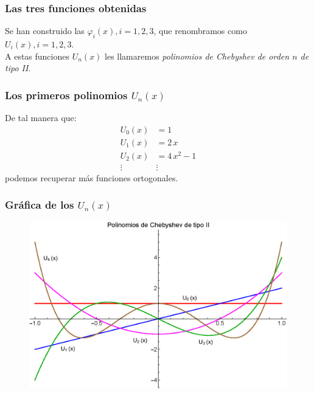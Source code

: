 \documentclass[12pt]{beamer}
\begin{document}
\begin{frame}
\frametitle{Las tres funciones obtenidas}
Se han construido las $\varphi_{i}(x), i = 1, 2, 3$, que renombramos como $U_{i}(x), i = 1, 2, 3$.
\\
\bigskip
\pause
A estas funciones $U_{n}(x)$ les llamaremos \emph{polinomios de Chebyshev de orden $n$ de tipo II}.
\end{frame}
\begin{frame}
\frametitle{Los primeros polinomios $U_{n}(x)$}
De tal manera que:
\pause
\begin{align*}
U_{0} (x) &= 1 \\[0.5em]
U_{1} (x) &= 2 \, x \\[0.5em]
U_{2} (x) &= 4 \, x^{2} - 1 \\[0.5em]
\vdots & \vdots
\end{align*}
podemos recuperar más funciones ortogonales.
\end{frame}
\begin{frame}
\frametitle{Gráfica de los $U_{n}(x)$}
\begin{figure}
    \centering
    \includegraphics[scale=0.62]{Imagenes/Gram_Schmidt_Chebyshev_2.eps}
\end{figure}
\end{frame}
\end{document}
